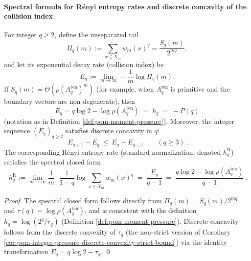 \paragraph{Spectral formula for R\'enyi entropy rates and discrete concavity of the collision index}
\begin{corollary}\label{cor:pom-renyi-rate-spectral-formula-discrete-concavity}
For integer \(q\ge 2\), define the unseparated tail
\[
\Pi_q(m):=\sum_{x\in X_m}w_m(x)^q=\frac{S_q(m)}{2^{mq}},
\]
and let its exponential decay rate (collision index) be
\[
E_q:=\lim_{m\to\infty}-\frac{1}{m}\log \Pi_q(m).
\]
If \(S_q(m)=\Theta(\rho(A_q^{\mathrm{ten}})^m)\) (for example, when \(A_q^{\mathrm{ten}}\) is primitive and the boundary vectors are non-degenerate), then
\[
\boxed{\;
E_q=q\log 2-\log\rho(A_q^{\mathrm{ten}})\;=\;h_q\;=\;-P(q)\; }
\]
(notation as in Definition \ref{def:pom-moment-pressure}).
Moreover, the integer sequence \((E_q)_{q\ge 2}\) satisfies discrete concavity in \(q\):
\[
\boxed{\;
E_{q+1}-E_q\ \le\ E_q-E_{q-1}\qquad(q\ge 3)\; }.
\]
The corresponding R\'enyi entropy rate (standard normalization, denoted \(h_q^{\mathrm R}\)) satisfies the spectral closed form
\[
\boxed{\;
h_q^{\mathrm R}
:=\lim_{m\to\infty}\frac{1}{m}\cdot\frac{1}{1-q}\log\sum_{x\in X_m}w_m(x)^q
\;=\;\frac{E_q}{q-1}
\;=\;\frac{q\log 2-\log\rho(A_q^{\mathrm{ten}})}{q-1}\; }.
\]
\end{corollary}
\begin{proof}
The spectral closed form follows directly from \(\Pi_q(m)=S_q(m)/2^{mq}\) and \(\tau(q)=\log\rho(A_q^{\mathrm{ten}})\), and is consistent with the definition \(h_q=\log(2^q/r_q)\) (Definition \ref{def:pom-moment-pressure}).
Discrete concavity follows from the discrete convexity of \(\tau_q\) (the non-strict version of Corollary \ref{cor:pom-integer-pressure-discrete-convexity-strict-bound}) via the identity transformation \(E_q=q\log2-\tau_q\). \qed
\end{proof}
